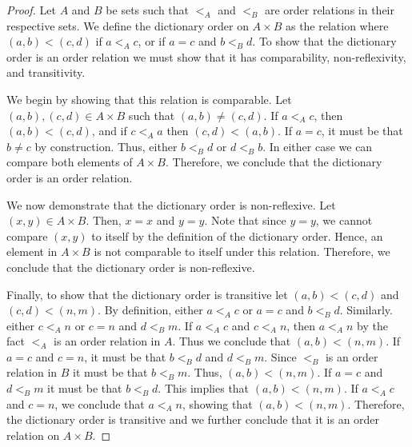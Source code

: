 \documentclass[12pt]{article}
\begin{document}
\begin{proof}
	Let $A$ and $B$ be sets such that $<_A$ and $<_B$ are order relations in their respective sets.
	We define the dictionary order on $A \times B$ as the relation where $(a, b) < (c, d)$
	if $a <_A c$, or if $a = c$ and $b <_B d.$ To show that the dictionary order is an
	order relation we must show that it has comparability, non-reflexivity, and transitivity.
	
	We begin by showing that this relation is comparable. Let $(a, b), (c, d) \in A \times B$
	such that $(a, b) \neq (c, d)$.
	If $a <_A c$, then $(a, b) < (c, d)$, and if $c <_A a$ then $(c, d) < (a, b)$. If 
	$a = c$, it must be that $b \neq c$ by construction. Thus, either $b <_B d$ or $d <_B b$.
	In either case we can compare both elements of $A \times B$. Therefore, we conclude that
	the dictionary order is an order relation.
	
	We now demonstrate that the dictionary order is non-reflexive. Let $(x, y) \in A \times B$.
	Then, $x = x$ and $y = y$. Note that since $y = y$, we cannot compare $(x, y)$ to itself
	by the definition of the dictionary order. Hence, an element in $A \times B$ is not comparable
	to itself under this relation. Therefore, we conclude that the dictionary order is 
	non-reflexive.
	
	Finally, to show that the dictionary order is transitive let $(a, b) < (c, d)$ and 
	$(c, d) < (n, m)$. By definition, either $a <_A c$ or $a = c$ and $b <_B d$. Similarly.
	either $c <_A n$ or $c = n$ and $d <_B m $. If $a <_A c$ and $c <_A n$, then 
	$a <_A n$ by the fact $<_A$ is an order relation in $A$. Thus we conclude that 
	$(a, b) < (n, m)$. If $a = c$ and $c = n$, it must be that $b <_B d$ and $d <_B m$. Since
	$<_B$ is an order relation in $B$ it must be that $b <_B m$. Thus, $(a, b) < (n, m)$. 
	If $a = c$ and $d <_B m$ it must be that $b <_B d$. This implies that $(a, b) < (n, m)$.
	If $a <_A c$ and $c = n$, we conclude that $a <_A n$, showing that $(a, b) < (n, m)$.
	Therefore, the dictionary order is transitive and we further conclude that it is an order 
	relation on $A \times B$.
\end{proof}
\end{document}
